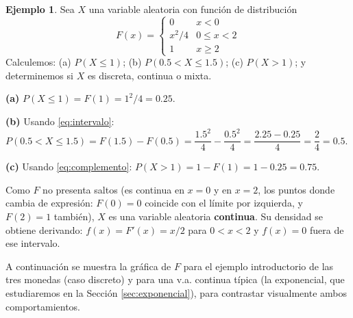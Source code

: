 \documentclass[11pt,a4paper]{article}
\theoremstyle{plain}
\theoremstyle{definition}
\newtheorem{ejemplo}[teorema]{Ejemplo}
\theoremstyle{remark}
\begin{document}
\begin{ejemplo}
Sea $X$ una variable aleatoria con función de distribución
$$F(x)=\begin{cases}0 & x<0\\ x^2/4 & 0\le x<2\\ 1 & x\ge 2\end{cases}$$
Calculemos: (a) $P(X\le 1)$; (b) $P(0.5<X\le 1.5)$; (c) $P(X>1)$; y determinemos si $X$ es discreta, continua o mixta.

\textbf{(a)} $P(X\le1)=F(1)=1^2/4=0.25$.

\textbf{(b)} Usando \eqref{eq:intervalo}: $P(0.5<X\le1.5)=F(1.5)-F(0.5)=\dfrac{1.5^2}{4}-\dfrac{0.5^2}{4}=\dfrac{2.25-0.25}{4}=\dfrac{2}{4}=0.5$.

\textbf{(c)} Usando \eqref{eq:complemento}: $P(X>1)=1-F(1)=1-0.25=0.75$.

Como $F$ no presenta saltos (es continua en $x=0$ y en $x=2$, los puntos donde cambia de expresión: $F(0)=0$ coincide con el límite por izquierda, y $F(2)=1$ también), $X$ es una variable aleatoria \textbf{continua}. Su densidad se obtiene derivando: $f(x)=F'(x)=x/2$ para $0<x<2$ y $f(x)=0$ fuera de ese intervalo.
\end{ejemplo}

A continuación se muestra la gráfica de $F$ para el ejemplo introductorio de las tres monedas (caso discreto) y para una v.a. continua típica (la exponencial, que estudiaremos en la Sección \ref{sec:exponencial}), para contrastar visualmente ambos comportamientos.

\begin{center}
\hspace{0.5cm}
\end{center}
\end{document}
